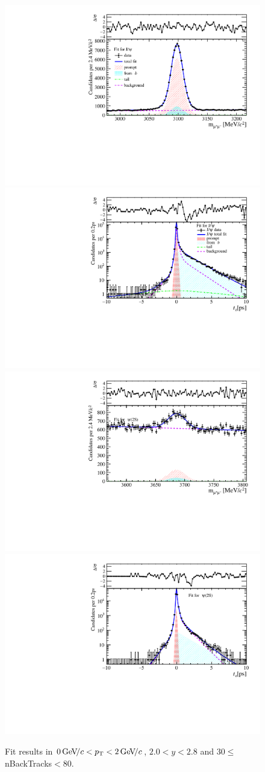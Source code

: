 \begin{figure}[H]
\begin{center}
\includegraphics[width=0.47\linewidth]{pdf/Jpsi/drawmassB/n5y1pt1.pdf}
\includegraphics[width=0.47\linewidth]{pdf/Jpsi/2DFitB/n5y1pt1.pdf}
\vspace*{-0.5cm}
\includegraphics[width=0.47\linewidth]{pdf/Psi2S/drawmassB/n5y1pt1.pdf}
\includegraphics[width=0.47\linewidth]{pdf/Psi2S/2DFitB/n5y1pt1.pdf}
\vspace*{-0.5cm}
\end{center}
\caption{Fit results in $0\text{\,Ge\kern -0.1em V\!/}c<p_{\mathrm{T}}<2\text{\,Ge\kern -0.1em V\!/}c$, $2.0<y<2.8$ and 30$\leq$nBackTracks$<$80.}
\label{Fitn5y1pt1}
\end{figure}
